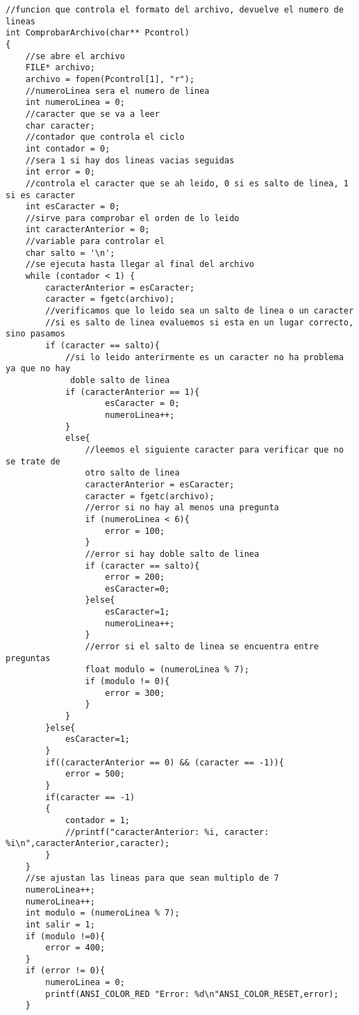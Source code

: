 \begin{verbatim}
//funcion que controla el formato del archivo, devuelve el numero de lineas
int ComprobarArchivo(char** Pcontrol)
{
    //se abre el archivo
    FILE* archivo;
    archivo = fopen(Pcontrol[1], "r");
    //numeroLinea sera el numero de linea
    int numeroLinea = 0; 
    //caracter que se va a leer
    char caracter;
    //contador que controla el ciclo
    int contador = 0;
    //sera 1 si hay dos lineas vacias seguidas
    int error = 0;
    //controla el caracter que se ah leido, 0 si es salto de linea, 1 si es caracter
    int esCaracter = 0;
    //sirve para comprobar el orden de lo leido
    int caracterAnterior = 0;
    //variable para controlar el 
    char salto = '\n';
    //se ejecuta hasta llegar al final del archivo
    while (contador < 1) {
        caracterAnterior = esCaracter;
        caracter = fgetc(archivo);
        //verificamos que lo leido sea un salto de linea o un caracter
        //si es salto de linea evaluemos si esta en un lugar correcto, sino pasamos
        if (caracter == salto){
            //si lo leido anterirmente es un caracter no ha problema ya que no hay
             doble salto de linea
            if (caracterAnterior == 1){
                    esCaracter = 0;
                    numeroLinea++;
            }
            else{
                //leemos el siguiente caracter para verificar que no se trate de 
                otro salto de linea
                caracterAnterior = esCaracter;
                caracter = fgetc(archivo);
                //error si no hay al menos una pregunta
                if (numeroLinea < 6){
                    error = 100;
                }
                //error si hay doble salto de linea
                if (caracter == salto){
                    error = 200;
                    esCaracter=0;
                }else{
                    esCaracter=1;
                    numeroLinea++;
                }
                //error si el salto de linea se encuentra entre preguntas
                float modulo = (numeroLinea % 7);
                if (modulo != 0){
                    error = 300;
                }
            }
        }else{
            esCaracter=1;
        }
        if((caracterAnterior == 0) && (caracter == -1)){
            error = 500;
        }
        if(caracter == -1)
        {
            contador = 1;
            //printf("caracterAnterior: %i, caracter: %i\n",caracterAnterior,caracter);
        }
    }
    //se ajustan las lineas para que sean multiplo de 7
    numeroLinea++;
    numeroLinea++;
    int modulo = (numeroLinea % 7);
    int salir = 1;
    if (modulo !=0){
        error = 400;
    }
    if (error != 0){
        numeroLinea = 0;
        printf(ANSI_COLOR_RED "Error: %d\n"ANSI_COLOR_RESET,error);
    }


\end{verbatim}
